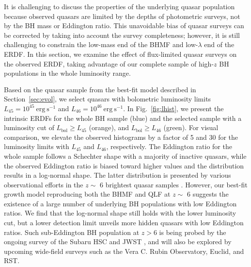 \documentclass[twocolumn, twocolappendix]{aastex63}
\newcommand{\Lbol}{L_\mathrm{bol}}
\begin{document}
\begin{CJK*}{UTF8}{gbsn}
It is challenging to discuss the properties of the underlying quasar population
because observed quasars are limited by the depths of photometric surveys, not by the BH mass or Eddington ratio.
This unavoidable bias of quasar surveys can be corrected by taking into account the survey completeness;
however, it is still challenging to constrain the low-mass end of the BHMF and low-$\lambda$ end of the ERDF.
In this section, we examine the effect of flux-limited quasar surveys on the observed ERDF, 
taking advantage of our complete sample of high-$z$ BH populations in the whole luminosity range. 


Based on the quasar sample from the best-fit model described in Section~\ref{sec:evol}, 
we select quasars with bolometric luminosity limits $L_{45}=10^{45}~\mathrm{erg~s^{-1}}$ and $L_{46}=10^{46}~\mathrm{erg~s^{-1}}$.
In Fig.~\ref{fig:lhist}, we present the intrinsic ERDFs for the whole BH sample (blue)
and the selected sample with a luminosity cut of $\Lbol \geq L_{45}$ (orange),
and $\Lbol \geq L_{46}$ (green).
For visual comparison, we elevate the observed histograms by a factor of 5 and 30
for the luminosity limits with $L_{45}$ and $L_{46}$, respectively.
The Eddington ratio for the whole sample follows a Schechter shape with a majority of inactive quasars, 
while the observed Eddington ratio is biased toward higher values and the distribution results in a log-normal shape. 
The latter distribution is presented by various observational efforts in the $z\sim$ 6 brightest quasar samples 
\citep[e.g.,][]{2010AJ....140..546W,2019ApJ...873...35S,2021ApJ...923..262Y,2022arXiv220705113F}.
However, our best-fit growth model reproducing both the BHMF and QLF at $z\sim$ 6 suggests the existence of
a large number of underlying BH populations with low Eddington ratios. 
We find that the log-normal shape still holds with the lower luminosity cut, 
but a lower detection limit unveils more hidden quasars with low Eddington ratios. 
Such sub-Eddington BH population at $z>6$ is being probed by the ongoing survey of the Subaru HSC and JWST
\citep{2019ApJ...880...77O,2021jwst.prop.1967O},
and will also be explored by upcoming wide-field surveys such as the Vera C. Rubin Observatory, Euclid, and RST.




\end{CJK*}
\end{document}
